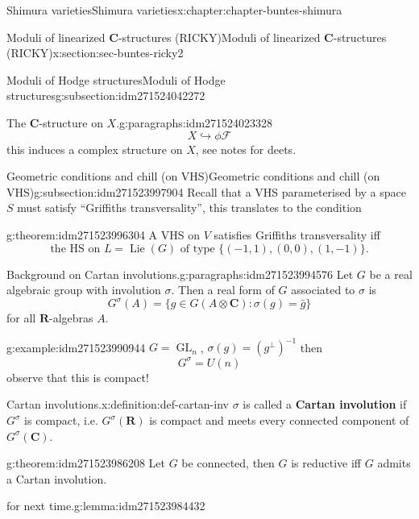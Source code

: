 \documentclass[oneside,10pt,]{book}
\newcommand{\terminology}[1]{\textbf{#1}}
\numberwithin{equation}{section}
\DeclareMathOperator{\Lie}{Lie}
\newcommand{\inv}{^{-1}}
\newcommand{\RR}{\mathbf{R}}
\newcommand{\CC}{\mathbf{C}}
\DeclareMathOperator{\GL}{GL}
\begin{document}
\begin{chapterptx}{Shimura varieties}{}{Shimura varieties}{}{}{x:chapter:chapter-buntes-shimura}
\begin{sectionptx}{Moduli of linearized \(\CC\)-structures (RICKY)}{}{Moduli of linearized \(\CC\)-structures (RICKY)}{}{}{x:section:sec-buntes-ricky2}
\begin{subsectionptx}{Moduli of Hodge structures}{}{Moduli of Hodge structures}{}{}{g:subsection:idm271524042272}
\begin{paragraphs}{The \(\CC\)-structure on \(X\).}{g:paragraphs:idm271524023328}
\begin{equation*}
X \hookrightarrow \phi \mathcal F
\end{equation*}
this induces a complex structure on \(X\), see notes for deets.%
\end{paragraphs}%
\end{subsectionptx}
%
%
\typeout{************************************************}
\typeout{************************************************}
%
\begin{subsectionptx}{Geometric conditions and chill (on VHS)}{}{Geometric conditions and chill (on VHS)}{}{}{g:subsection:idm271523997904}
Recall that a VHS parameterised by a space \(S\) must satisfy ``Griffiths transversality'', this translates to the condition%
\begin{theorem}{}{}{g:theorem:idm271523996304}%
A VHS on \(V\) satisfies Griffiths transversality iff%
\begin{equation}
\text{the HS  on } L = \Lie(G) \text{ of type }\{(-1,1),(0,0),(1,-1)\}\text{.}\label{g:men:idm271523995344}
\end{equation}
%
\end{theorem}
\begin{paragraphs}{Background on Cartan involutions.}{g:paragraphs:idm271523994576}%
Let \(G\) be a real algebraic group with involution \(\sigma\). Then a real form of \(G\)  associated to \(\sigma\) is%
\begin{equation*}
G^\sigma (A) = \{ g \in G(A \otimes \CC) : \sigma(g) = \bar g\}
\end{equation*}
for all \(\RR\)-algebras \(A\).%
\begin{example}{}{g:example:idm271523990944}%
\(G = \GL_n\), \(\sigma(g) = (g^\perp)\inv\) then%
\begin{equation*}
G^\sigma = U(n)
\end{equation*}
observe that this is compact!%
\end{example}
\begin{definition}{Cartan involutions.}{x:definition:def-cartan-inv}%
\(\sigma\) is called a \terminology{Cartan involution} if \(G^\sigma\) is compact, i.e. \(G^\sigma(\RR)\) is compact and meets every connected component of \(G^\sigma(\CC)\).%
\end{definition}
\begin{theorem}{}{}{g:theorem:idm271523986208}%
Let \(G\) be connected, then \(G\) is reductive iff \(G\) admits a Cartan involution.%
\end{theorem}
\begin{lemma}{for next time.}{}{g:lemma:idm271523984432}%

\end{lemma}
\end{paragraphs}
\end{subsectionptx}
\end{sectionptx}
\end{chapterptx}
\end{document}
